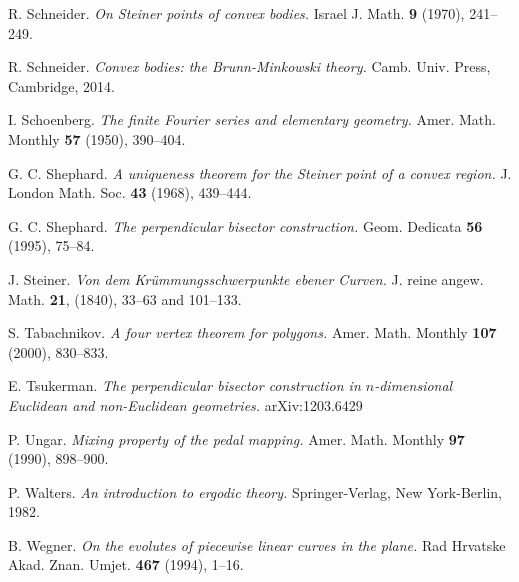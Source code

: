 \documentclass[12pt]{article}
\begin{document}
\begin{thebibliography}{99}
 R. Schneider. {\it On Steiner points of convex bodies.} Israel J. Math. {\bf 9} (1970), 241--249.

 R. Schneider. {\it Convex bodies: the Brunn-Minkowski theory.} Camb. Univ. Press, Cambridge, 2014.

 I. Schoenberg. {\it The finite Fourier series and elementary geometry.} Amer. Math. Monthly {\bf 57} (1950), 390--404. 

 G. C. Shephard. {\it A uniqueness theorem for the Steiner point of a convex region.} J. London Math. Soc. {\bf 43} (1968), 439--444.

 G. C. Shephard. {\it The perpendicular bisector construction.} Geom. Dedicata {\bf 56} (1995), 75--84. 

 J. Steiner. {\it Von dem Kr\"ummungsschwerpunkte ebener Curven.} J. reine angew. Math. {\bf 21}, (1840), 33--63 and 101--133.

 S. Tabachnikov. {\it A four vertex theorem for polygons.} Amer. Math. Monthly {\bf 107} (2000), 830--833.

 E. Tsukerman. {\it The perpendicular bisector construction in $n$-dimensional Euclidean and non-Euclidean geometries.}  arXiv:1203.6429

 P. Ungar. {\it Mixing property of the pedal mapping.} 
Amer. Math. Monthly {\bf 97} (1990), 898--900.

 P. Walters. {\it An introduction to ergodic theory.}
Springer-Verlag, New York-Berlin, 1982. 

 B. Wegner. {\it On the evolutes of piecewise linear curves in the plane.}
Rad Hrvatske Akad. Znan. Umjet. {\bf 467} (1994), 1--16. 

\end{thebibliography}
\end{document}
